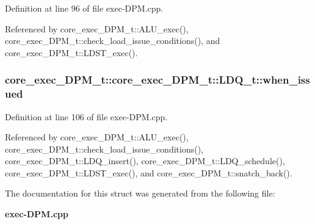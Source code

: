 Definition at line 96 of file exec-DPM.cpp.

Referenced by core\_\-exec\_\-DPM\_\-t::ALU\_\-exec(), core\_\-exec\_\-DPM\_\-t::check\_\-load\_\-issue\_\-conditions(), and core\_\-exec\_\-DPM\_\-t::LDST\_\-exec().
\subsubsection[{when\_\-issued}]{ core\_\-exec\_\-DPM\_\-t::core\_\-exec\_\-DPM\_\-t::LDQ\_\-t::when\_\-issued}\label{structcore__exec__DPM__t_1_1LDQ__t_1b66eb313a8160ccb653bfe35058c01d}




Definition at line 106 of file exec-DPM.cpp.

Referenced by core\_\-exec\_\-DPM\_\-t::ALU\_\-exec(), core\_\-exec\_\-DPM\_\-t::check\_\-load\_\-issue\_\-conditions(), core\_\-exec\_\-DPM\_\-t::LDQ\_\-insert(), core\_\-exec\_\-DPM\_\-t::LDQ\_\-schedule(), core\_\-exec\_\-DPM\_\-t::LDST\_\-exec(), and core\_\-exec\_\-DPM\_\-t::snatch\_\-back().

The documentation for this struct was generated from the following file:\begin{CompactItemize}
\item 
{\bf exec-DPM.cpp}\end{CompactItemize}

